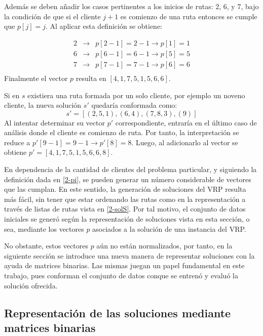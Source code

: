 Además se deben añadir los casos pertinentes a los inicios de rutas: 2, 6, y 7, bajo la condición de que si el cliente $j + 1$ es comienzo de una ruta entonces se cumple que $p[j] = j$. Al aplicar esta definición se obtiene:

\begin{eqnarray*}
	2 & \rightarrow & p [2 - 1] = 2 - 1 \rightarrow p[1] = 1\\
	6 & \rightarrow & p [6 - 1] = 6 - 1 \rightarrow p[5] = 5\\
	7 & \rightarrow & p[7 - 1] = 7 - 1  \rightarrow p[6] = 6\\
\end{eqnarray*}
Finalmente el vector $p$ resulta en $[4, 1, 7, 5, 1, 5, 6, 6]$.



Si en $s$ existiera una ruta formada por un solo cliente, por ejemplo un noveno cliente, la nueva solución $s'$ quedaría conformada como:
\begin{equation}
\label{2-s9}
	s' = [(2, 5, 1), (6, 4), (7, 8, 3), (9)]
\end{equation}
 Al intentar determinar su vector $p'$ correspondiente,  entraría en el último caso de análisis donde el cliente es comienzo de ruta. Por tanto, la interpretación se reduce a $p'[9 - 1] = 9-1 \rightarrow p'[8] = 8$. Luego, al adicionarlo al vector se obtiene $p' = [4, 1, 7, 5, 1, 5, 6, 6, 8]$. 
 
 En dependencia de la cantidad de clientes del problema particular, y siguiendo la definición dada en \ref{2-pi}, se pueden generar un número considerable de vectores que las cumplan. En este sentido, la generación de soluciones del VRP resulta más fácil, sin tener que estar ordenando las rutas como en la representación a través de listas de rutas vista en \ref{2-solS}. Por tal motivo, el conjunto de datos iniciales se generó según la representación de soluciones vista en esta sección, o sea, mediante los vectores $p$ asociados a la solución de una instancia del VRP.
 
 No obstante, estos vectores $p$ aún no están normalizados, por tanto, en la siguiente sección se introduce una nueva manera de representar soluciones con la ayuda de matrices binarias. Las mismas juegan un papel fundamental en este trabajo, pues conforman el conjunto de datos conque se entrenó y evaluó la solución ofrecida. 
 
\subsection{Representación de las soluciones mediante matrices binarias}\label{2-Matrix}


